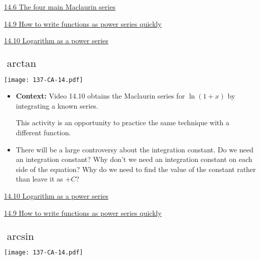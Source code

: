 \documentclass[11pt]{article}
\newcommand{\nl}{\hfill \vspace{-1.1\baselineskip}} %
\newcommand{\vvi}{\hspace{8mm}  \href{https://www.youtube.com/watch?v=o-RSENE_Yus&list=PLlwePzQY_wW9h32ZwS6CYsY4eR_b2pE9j&index=6}{14.6 The four main Maclaurin series}}
\newcommand{\vix}{\hspace{8mm}  \href{https://www.youtube.com/watch?v=ksKu5p2qvB4&list=PLlwePzQY_wW9h32ZwS6CYsY4eR_b2pE9j&index=9}{14.9 How to write functions as power series quickly}}
\newcommand{\vx}{\hspace{8mm}  \href{https://www.youtube.com/watch?v=NYVjEbpY21w&list=PLlwePzQY_wW9h32ZwS6CYsY4eR_b2pE9j&index=10}{14.10 Logarithm as a power series}}
\begin{document}
\begin{videos}
\vvi

\vix

\vx
\end{videos}

\newpage
\subsection{$\arctan$}

\begin{center}
{ \texttt{[image: 137-CA-14.pdf]}} 
\end{center}

\begin{comments}
\nl
	\begin{itemize}
		\item {\bf Context:}  Video 14.10 obtains the Maclaurin series for $\ln(1+x)$ by integrating a known series.   
		
		This activity is an opportunity to practice the same technique with a different function.
		
		\item There will be a large controversy about the integration constant.  Do we need an integration constant?  Why don't we need an integration constant on each side of the equation?  Why do we need to find the value of the constant rather than leave it as $+C$?
	\end{itemize}
\end{comments}

\begin{videos}
\vx

\vix
\end{videos}

\newpage
\subsection{$\arcsin$}

\begin{center}
{ \texttt{[image: 137-CA-14.pdf]}} 
\end{center}
\end{document}
